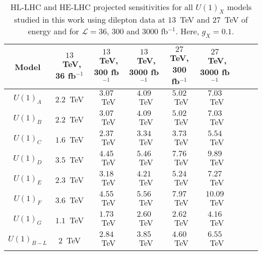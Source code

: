 \begin{table*}[!t]
\centering
\small\begin{tabular}{ccccccccc}
\hline 
Model & $13$~TeV, 36 fb$^{-1}$ & $13$~TeV, 300 fb$^{-1}$ &  $13$~TeV, 3000 fb$^{-1}$ & $27$ TeV, 300 fb$^{-1}$  & $27$~TeV, 3000 fb$^{-1}$\\ \hline 
$U(1)_A$ & $2.2$~TeV & $3.07$~TeV & $4.09$~TeV & $5.02$~TeV & $7.03$~TeV \\
$U(1)_B$ & $2.2$~TeV & $3.07$~TeV & $4.09$~TeV & $5.02$~TeV & $7.03$~TeV \\
$U(1)_C$ & $1.6$~TeV & $2.37$~TeV & $3.34$~TeV & $3.73$~TeV & $5.54$~TeV \\
$U(1)_D$ & $3.5$~TeV & $4.45$~TeV & $5.46$~TeV & $7.76$~TeV & $9.89$~TeV \\
$U(1)_E$ & $2.3$~TeV & $3.18$~TeV & $4.21$~TeV & $5.24$~TeV & $7.27$~TeV \\
$U(1)_F$ & $3.6$~TeV & $4.55$~TeV & $5.56$~TeV & $7.97$~TeV & $10.09$~TeV \\
$U(1)_G$ & $1.1$~TeV & $1.73$~TeV & $2.60$~TeV & $2.62$~TeV & $4.16$~TeV \\
$U(1)_{B-L}$ & $2$~TeV & $2.84$~TeV & $3.85$~TeV & $4.60$~TeV  & $6.55$~TeV \\
\hline
\end{tabular}\normalsize
\caption{HL-LHC and HE-LHC projected sensitivities for all $U(1)_X$ models studied in this work
using dilepton data at $13$~TeV and $27$~TeV of \com energy and for $\mathcal{L}=36$, 300 and 3000 fb$^{-1}$. Here, $g_X =0.1$.}
\label{tab:LHCforcast}
\end{table*}



